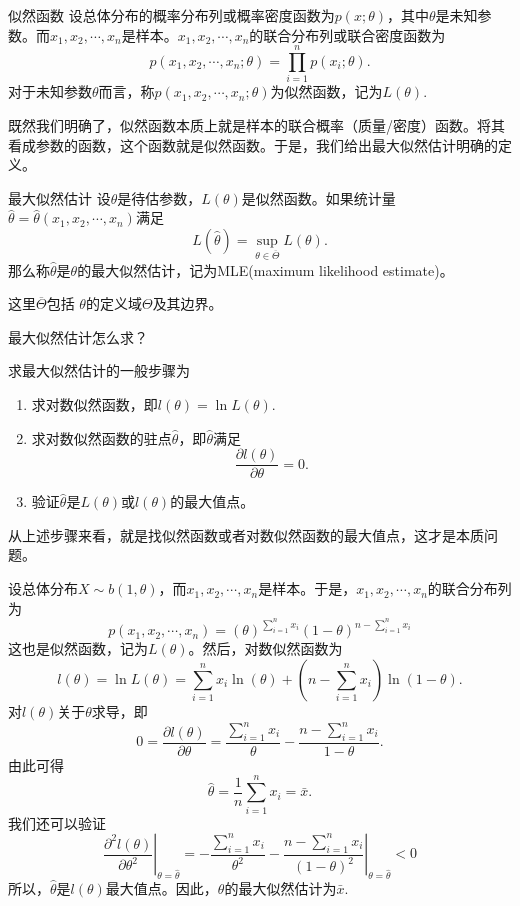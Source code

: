 \begin{definition}{似然函数}
    设总体分布的概率分布列或概率密度函数为$p(x;\theta)$，其中$\theta$是未知参数。而$x_1,x_2,\cdots,x_n$是样本。$x_1,x_2,\cdots,x_n$的联合分布列或联合密度函数为
    $$
    p(x_1,x_2,\cdots,x_n;\theta) = \prod_{i=1}^n p(x_i;\theta).
    $$
    对于未知参数$\theta$而言，称$p(x_1,x_2,\cdots,x_n;\theta)$为似然函数，记为$L(\theta)$.
\end{definition}
既然我们明确了，似然函数本质上就是样本的联合概率（质量/密度）函数。将其看成参数的函数，这个函数就是似然函数。于是，我们给出最大似然估计明确的定义。
\begin{definition}{最大似然估计}
    设$\theta$是待估参数，$L(\theta)$是似然函数。如果统计量$\hat{\theta} = \hat{\theta}(x_1,x_2,\cdots,x_n)$满足
    $$
    L(\hat{\theta}) = \sup_{\theta\in \overline{\Theta}} L(\theta).
    $$
    那么称$\hat{\theta}$是$\theta$的最大似然估计，记为MLE(maximum likelihood estimate)。
\end{definition}
\begin{remark}
这里$\overline{\Theta}$包括 $\theta$的定义域$\Theta$及其边界。
\end{remark}
\begin{problem}
    最大似然估计怎么求？
\end{problem}
求最大似然估计的一般步骤为
\begin{enumerate}
    \item 求对数似然函数，即$l(\theta) = \ln L(\theta)$.
    \item 求对数似然函数的驻点$\hat{\theta}$，即$\hat{\theta}$满足
    $$
    \frac{\partial l(\theta)}{\partial \theta} = 0.
    $$
    \item 验证$\hat{\theta}$是$L(\theta)$或$l(\theta)$的最大值点。
\end{enumerate}
\begin{remark}
    从上述步骤来看，就是找似然函数或者对数似然函数的最大值点，这才是本质问题。
\end{remark}

\begin{example}
    设总体分布$X\sim b(1,\theta)$，而$x_1,x_2,\cdots,x_n$是样本。于是，$x_1,x_2,\cdots,x_n$的联合分布列为
    $$
    p(x_1,x_2,\cdots,x_n) = (\theta)^{\sum_{i=1}^n x_i} (1-\theta)^{n-\sum_{i=1}^n x_i}
    $$
    这也是似然函数，记为$L(\theta)$。然后，对数似然函数为
    $$
    l(\theta) = \ln L(\theta) = \sum_{i=1}^n x_i \ln (\theta) + (n-\sum_{i=1}^n x_i) \ln (1-\theta).
    $$
    对$l(\theta)$关于$\theta$求导，即
    $$
    0=\frac{\partial l(\theta)}{\partial \theta} = \frac{\sum_{i=1}^n x_i}{\theta} - \frac{n-\sum_{i=1}^n x_i}{1-\theta}.
    $$
    由此可得
    $$
    \hat{\theta} = \frac{1}{n} \sum_{i=1}^n x_i = \bar{x}.
    $$
    我们还可以验证
    $$
   \left. \frac{\partial^2 l(\theta)}{\partial \theta^2}\right|_{\theta = \hat{\theta}} = \left.-\frac{\sum_{i=1}^n x_i}{\theta^2} - \frac{n-\sum_{i=1}^n x_i}{(1-\theta)^2} \right|_{\theta = \hat{\theta}} < 0
    $$
    所以，$\hat{\theta}$是$l(\theta)$最大值点。因此，$\theta$的最大似然估计为$\bar{x}$.
\end{example}
    

